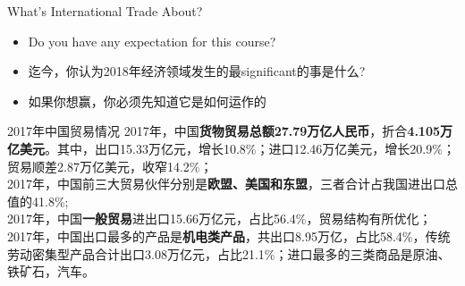 \documentclass[10pt,hyperref={CJKbookmarks=true},xcolor=dvipsnames,aspectratio=169]{beamer}
\begin{document}
\begin{frame}{What's International Trade About?}




\begin{itemize}
	\item Do you have any expectation for this course?
	\item 迄今，你认为2018年经济领域发生的最significant的事是什么?
	\item 如果你想赢，你必须先知道它是如何运作的
\end{itemize}
\begin{block}{2017年中国贸易情况}
	2017年，中国\textbf{货物贸易总额27.79万亿人民币}，折合\textbf{4.105万亿美元}。其中，出口15.33万亿元，增长10.8\%；进口12.46万亿美元，增长20.9\%；贸易顺差2.87万亿美元，收窄14.2\%；\\
	2017年，中国前三大贸易伙伴分别是\textbf{欧盟、美国和东盟}，三者合计占我国进出口总值的41.8\%;\\
	2017年，中国\textbf{一般贸易}进出口15.66万亿元，占比56.4\%，贸易结构有所优化；\\
	2017年，中国出口最多的产品是\textbf{机电类产品}，共出口8.95万亿，占比58.4\%，传统劳动密集型产品合计出口3.08万亿元，占比21.1\%；进口最多的三类商品是原油、铁矿石，汽车。\\
\end{block}
\end{frame}
\end{document}
